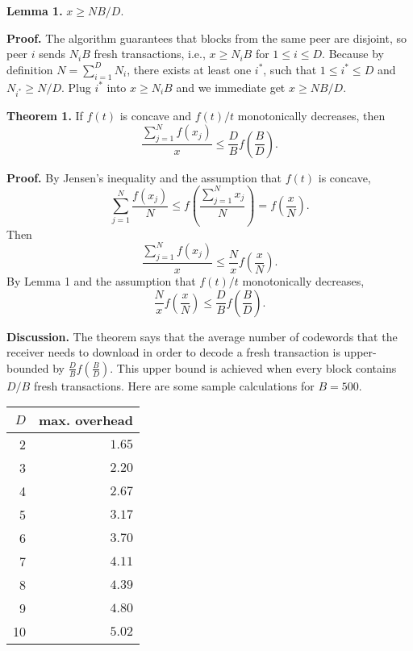 \documentclass{article}
\begin{document}
\smallskip
\noindent
\textbf{Lemma 1.} $x \ge NB/D.$

\smallskip
\noindent \textbf{Proof.} The algorithm guarantees that blocks from the same
peer are disjoint, so peer $i$ sends $N_i B$ fresh transactions, i.e., $x \ge
N_i B$ for $1 \le i \le D$. Because by definition $N=\sum_{i=1}^D N_i$, there
exists at least one $i^*$, such that $1 \le i^* \le D$ and $N_{i^*} \ge N/D$.
Plug $i^*$ into $x \ge N_i B$ and we immediate get $x \ge NB/D$.

\smallskip
\noindent
\textbf{Theorem 1.} If $f(t)$ is concave and $f(t)/t$ monotonically decreases, then $$\frac{\sum_{j=1}^N f(x_j)}{x} \le \frac{D}{B}f\left(\frac{B}{D}\right).$$ 

\smallskip \noindent \textbf{Proof.} By Jensen's inequality and the assumption
that $f(t)$ is concave, $$\sum_{j=1}^N \frac{f(x_j)}{N} \le
f\left(\frac{\sum_{j=1}^N x_j}{N}\right) = f\left(\frac{x}{N}\right).$$ Then
$$\frac{\sum_{j=1}^N f(x_j)}{x} \le \frac{N}{x}f\left(\frac{x}{N}\right).$$ By
Lemma 1 and the assumption that $f(t)/t$ monotonically decreases,
$$\frac{N}{x}f\left(\frac{x}{N}\right) \le
\frac{D}{B}f\left(\frac{B}{D}\right).$$ 

\smallskip \noindent \textbf{Discussion.} The theorem says that the average
number of codewords that the receiver needs to download in order to decode a
fresh transaction is upper-bounded by $\frac{D}{B}f\left(\frac{B}{D}\right)$.
This upper bound is achieved when every block contains $D/B$ fresh transactions.
Here are some sample calculations for $B=500$.

\begin{center}
\begin{tabular}{ r|r }
    \hline
    $D$ & max. overhead\\\hline
    2 & $1.65$ \\
    3 & $2.20$ \\
    4 & $2.67$ \\
    5 & $3.17$ \\
    6 & $3.70$ \\
    7 & $4.11$ \\
    8 & $4.39$ \\
    9 & $4.80$ \\
    10 & $5.02$ \\
 \hline
\end{tabular}
\end{center}
\end{document}
